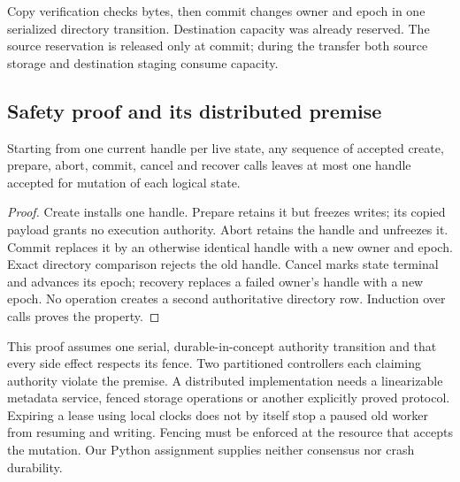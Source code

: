 Copy verification checks bytes, then commit changes owner and epoch in one
serialized directory transition. Destination capacity was already reserved.
The source reservation is released only at commit; during the transfer both
source storage and destination staging consume capacity.


\subsection{Safety proof and its distributed premise}
\begin{proposition}
Starting from one current handle per live state, any sequence of accepted
create, prepare, abort, commit, cancel and recover calls leaves at most one
handle accepted for mutation of each logical state.
\end{proposition}
\begin{proof}
Create installs one handle. Prepare retains it but freezes writes; its copied
payload grants no execution authority. Abort retains the handle and unfreezes
it. Commit replaces it by an otherwise identical handle with a new owner and
epoch. Exact directory comparison rejects the old handle. Cancel marks state
terminal and advances its epoch; recovery replaces a failed owner's handle
with a new epoch. No operation creates a second authoritative directory row.
Induction over calls proves the property.
\end{proof}

This proof assumes one serial, durable-in-concept authority transition and
that every side effect respects its fence. Two partitioned controllers each
claiming authority violate the premise. A distributed implementation needs a
linearizable metadata service, fenced storage operations or another explicitly
proved protocol. Expiring a lease using local clocks does not by itself stop
a paused old worker from resuming and writing. Fencing must be enforced at
the resource that accepts the mutation. Our Python assignment supplies neither
consensus nor crash durability.

